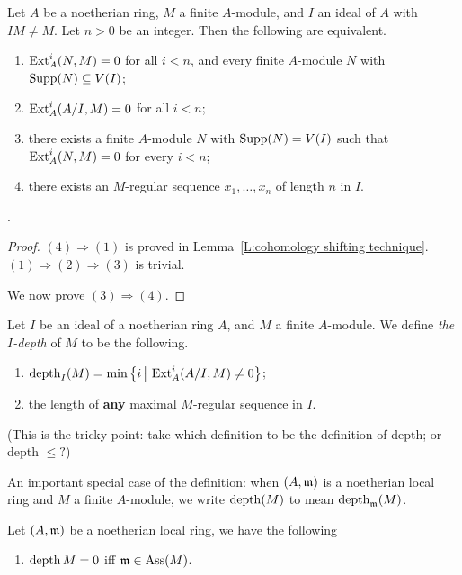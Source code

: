 	
	\begin{theorem}
		Let $A$ be a noetherian ring, $M$ a finite $A$-module, and $I$ an ideal of $A$ with $IM \neq M$. Let $n >0$ be an integer. Then the following are equivalent.
		\begin{enumerate}
			\item $\operatorname{Ext}^i_A(N,M)=0$ for all $i<n$, and every finite $A$-module $N$ with $\operatorname{Supp}(N) \subseteq V(I)$;
			\item $\operatorname{Ext}_A^i(A/I, M) =0$ for all $i<n$;
			\item there exists a finite $A$-module $N$ with $\operatorname{Supp}(N) = V(I)$ such that $\operatorname{Ext}^i_A(N, M) =0 $ for every $i<n$;
			\item there exists an $M$-regular sequence $x_1, \dots, x_n$ of length $n$ in $I$.
		\end{enumerate}
		
		\cite[Theorem 28, page 101]{matsumura-alg}.
	\end{theorem}
	\begin{proof}
		$(4)\Rightarrow (1)$ is proved in Lemma~\ref{L:cohomology shifting technique}.
		$(1) \Rightarrow (2) \Rightarrow (3)$ is trivial.
		
		We now prove $(3) \Rightarrow (4)$.
	\end{proof}
	
	\begin{definition}
		Let $I$ be an ideal of a noetherian ring $A$, and $M$ a finite $A$-module.
		We define \emph{the $I$-depth} of $M$ to be the following.
		\begin{enumerate}
			\item $\operatorname{depth}_I(M) = \min\big\{ i\,\big|\, \operatorname{Ext}_A^i(A/I, M)\neq 0\big\}$;
			\item the length of {\bf any} maximal $M$-regular sequence in $I$.
		\end{enumerate}
		
		(This is the tricky point: take which definition to be the definition of depth; or depth $\leq ?$)
		
		An important special case of the definition: when $(A, \mathfrak{m})$ is a noetherian local ring and $M$ a finite $A$-module, we write $\operatorname{depth}(M)$ to mean $\operatorname{depth}_{\mathfrak{m}}(M)$.
	\end{definition}
	
	\begin{lemma}
		Let $(A, \mathfrak{m})$ be a noetherian local ring, we have the following
		\begin{enumerate}
			\item $\operatorname{depth} M=0$ iff $\mathfrak{m} \in \operatorname{Ass}(M)$.
		\end{enumerate}
	\end{lemma}
	
